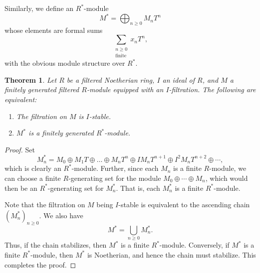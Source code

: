 \documentclass[11pt]{article}
\theoremstyle{thmstyle}
\newtheorem{theorem}{Theorem}[section]
\theoremstyle{defstyle}
\renewcommand{\ge}{\geqslant}
\begin{document}
Similarly, we define an $R^\ast$-module 
\begin{equation*}
    M^\ast = \bigoplus_{n\ge 0} M_nT^n
\end{equation*}
whose elements are formal sums 
\begin{equation*}
    \sum_{\substack{n\ge 0\\\text{finite}}} x_n T^n,
\end{equation*}
with the obvious module structure over $R^\ast$.

\begin{theorem}
    Let $R$ be a filtered Noetherian ring, $I$ an ideal of $R$, and $M$ a finitely generated filtered $R$-module equipped with an $I$-filtration. The following are equivalent: 
    \begin{enumerate}[label=(\arabic*)]
        \item The filtration on $M$ is $I$-stable. 
        \item $M^\ast$ is a finitely generated $R^\ast$-module.
    \end{enumerate}
\end{theorem}
\begin{proof}
    Set 
    \begin{equation*}
        M_n^\ast = M_0\oplus M_1T\oplus\dots\oplus M_nT^n\oplus IM_nT^{n + 1}\oplus I^2 M_n T^{n + 2}\oplus\cdots,
    \end{equation*}
    which is clearly an $R^\ast$-module. Further, since each $M_n$ is a finite $R$-module, we can choose a finite $R$-generating set for the module $M_0\oplus \cdots\oplus M_n$, which would then be an $R^\ast$-generating set for $M_n^\ast$. That is, each $M_n^\ast$ is a finite $R^\ast$-module.

    Note that the filtration on $M$ being $I$-stable is equivalent to the ascending chain $(M_n^\ast)_{n\ge 0}$. We also have 
    \begin{equation*}
        M^\ast = \bigcup_{n\ge 0} M_n^\ast.
    \end{equation*}
    Thus, if the chain stabilizes, then $M^\ast$ is a finite $R^\ast$-module. Conversely, if $M^\ast$ is a finite $R^\ast$-module, then $M^\ast$ is Noetherian, and hence the chain must stabilize. This completes the proof.
\end{proof}
\end{document}
